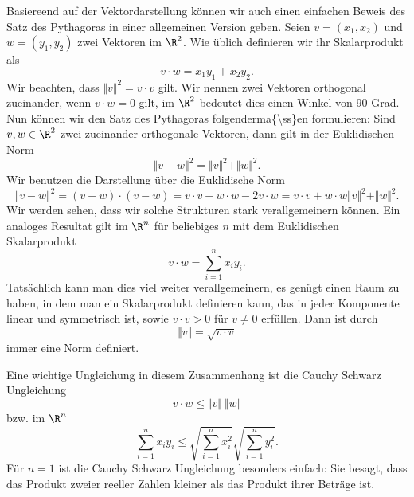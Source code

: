 \documentclass[letterpaper,10pt,english]{jupyterBook}
\begin{document}
Basiereend auf der Vektordarstellung können wir auch einen einfachen Beweis des Satz des Pythagoras in einer allgemeinen Version geben. Seien \(v=(x_1,x_2)\) und \(w=(y_1,y_2)\) zwei Vektoren im \(\R^2\). Wie üblich definieren wir ihr Skalarprodukt als
\begin{equation*}
 v \cdot w = x_1 y_1 + x_2 y_2 .\end{equation*}
Wir beachten, dass \(\Vert v \Vert^2 = v \cdot v\) gilt.
Wir nennen zwei Vektoren orthogonal zueinander, wenn \(v \cdot w = 0\) gilt, im \(\R^2\) bedeutet dies einen Winkel von 90 Grad.
Nun können wir den Satz des Pythagoras folgenderma\{\textbackslash{}ss\}en formulieren: Sind \(v,w \in \R^2\) zwei zueinander orthogonale Vektoren, dann gilt in der Euklidischen Norm
\begin{equation*}
 \Vert v - w \Vert^2 =  \Vert v \Vert^2 + \Vert w \Vert^2.\end{equation*}
Wir benutzen die Darstellung über die Euklidische Norm
\begin{equation*}
 \Vert v - w \Vert^2 = (v-w) \cdot (v-w) = v \cdot v + w\cdot w - 2 v \cdot w = v \cdot v + w\cdot w  \Vert v \Vert^2 + \Vert w \Vert^2.\end{equation*}
Wir werden sehen, dass wir solche Strukturen stark verallgemeinern können. Ein analoges Resultat gilt im \(\R^n\) für beliebiges \(n\) mit dem Euklidischen Skalarprodukt
\begin{equation*}
 v \cdot w = \sum_{i=1}^n x_i y_i .\end{equation*}
Tatsächlich kann man dies viel weiter verallgemeinern, es genügt einen Raum zu haben, in dem man ein Skalarprodukt definieren kann, das in jeder Komponente linear und symmetrisch ist, sowie \(v \cdot v > 0 \) für \(v \neq 0\) erfüllen.
Dann ist durch
\begin{equation*}
 \Vert v \Vert = \sqrt{ v \cdot v}\end{equation*}
immer eine Norm definiert.

Eine wichtige Ungleichung in diesem Zusammenhang ist die Cauchy Schwarz Ungleichung
\begin{equation*}
 v \cdot w \leq \Vert v \Vert~ \Vert w  \Vert
\end{equation*}
bzw. im \(\R^n\)
\begin{equation*}
 \sum_{i=1}^n x_i y_i \leq \sqrt{\sum_{i=1}^n x_i^2} \sqrt{\sum_{i=1}^n y_i^2} .
\end{equation*}
Für \(n=1\) ist die Cauchy Schwarz Ungleichung besonders einfach: Sie besagt, dass das Produkt zweier reeller Zahlen kleiner als das Produkt ihrer Beträge ist.
\end{document}
